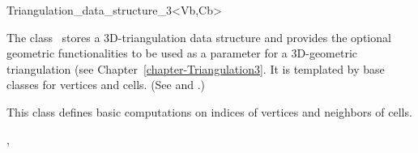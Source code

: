

\begin{ccRefClass}{Triangulation_data_structure_3<Vb,Cb>}  %


\ccDefinition
The class \ccRefName\ stores a 3D-triangulation data structure
and provides the optional
geometric functionalities to be used as a parameter for a 
3D-geometric triangulation (see Chapter~\ref{chapter-Triangulation3}. 
It is templated by base classes for vertices and cells.
(See  
and .) 

\ccIsModel



This class  defines basic computations on
indices of vertices and neighbors of cells. 


\ccSeeAlso

,




\end{ccRefClass}



